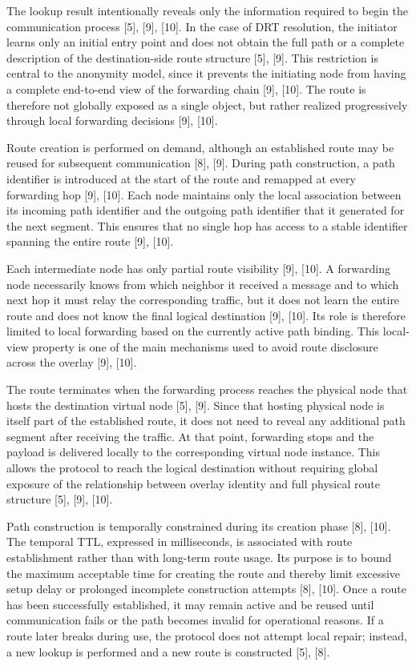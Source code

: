 \documentclass[12pt,a4paper]{article}
\begin{document}
The lookup result intentionally reveals only the information required to begin the communication process [5], [9], [10]. In the case of DRT resolution, the initiator learns only an initial entry point and does not obtain the full path or a complete description of the destination-side route structure [5], [9]. This restriction is central to the anonymity model, since it prevents the initiating node from having a complete end-to-end view of the forwarding chain [9], [10]. The route is therefore not globally exposed as a single object, but rather realized progressively through local forwarding decisions [9], [10].

Route creation is performed on demand, although an established route may be reused for subsequent communication [8], [9]. During path construction, a path identifier is introduced at the start of the route and remapped at every forwarding hop [9], [10]. Each node maintains only the local association between its incoming path identifier and the outgoing path identifier that it generated for the next segment. This ensures that no single hop has access to a stable identifier spanning the entire route [9], [10].

Each intermediate node has only partial route visibility [9], [10]. A forwarding node necessarily knows from which neighbor it received a message and to which next hop it must relay the corresponding traffic, but it does not learn the entire route and does not know the final logical destination [9], [10]. Its role is therefore limited to local forwarding based on the currently active path binding. This local-view property is one of the main mechanisms used to avoid route disclosure across the overlay [9], [10].

The route terminates when the forwarding process reaches the physical node that hosts the destination virtual node [5], [9]. Since that hosting physical node is itself part of the established route, it does not need to reveal any additional path segment after receiving the traffic. At that point, forwarding stops and the payload is delivered locally to the corresponding virtual node instance. This allows the protocol to reach the logical destination without requiring global exposure of the relationship between overlay identity and full physical route structure [5], [9], [10].

Path construction is temporally constrained during its creation phase [8], [10]. The temporal TTL, expressed in milliseconds, is associated with route establishment rather than with long-term route usage. Its purpose is to bound the maximum acceptable time for creating the route and thereby limit excessive setup delay or prolonged incomplete construction attempts [8], [10]. Once a route has been successfully established, it may remain active and be reused until communication fails or the path becomes invalid for operational reasons. If a route later breaks during use, the protocol does not attempt local repair; instead, a new lookup is performed and a new route is constructed [5], [8].
\end{document}
